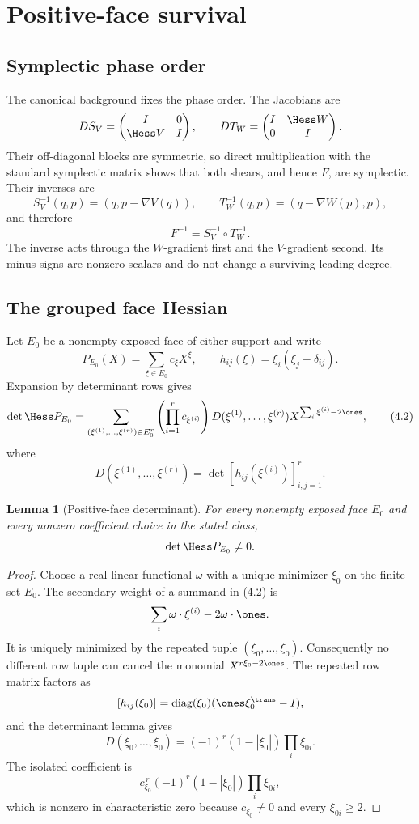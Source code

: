 \documentclass[11pt]{article}
\newtheorem{lemma}[theorem]{Lemma}
\theoremstyle{definition}
\theoremstyle{remark}
\begin{document}
\section{Positive-face survival}

\subsection{Symplectic phase order}

The canonical background fixes the phase order.  The Jacobians are
\[
 DS_V=\begin{pmatrix}I&0\\ \Hess V&I\end{pmatrix},\qquad
 DT_W=\begin{pmatrix}I&\Hess W\\0&I\end{pmatrix}.
\]
Their off-diagonal blocks are symmetric, so direct multiplication with the
standard symplectic matrix shows that both shears, and hence \(F\), are
symplectic.  Their inverses are
\[
 S_V^{-1}(q,p)=(q,p-\nabla V(q)),\qquad
 T_W^{-1}(q,p)=(q-\nabla W(p),p),
\]
and therefore
\[
 F^{-1}=S_V^{-1}\circ T_W^{-1}.
\tag{4.1}
\]
The inverse acts through the \(W\)-gradient first and the \(V\)-gradient
second.  Its minus signs are nonzero scalars and do not change a surviving
leading degree.

\subsection{The grouped face Hessian}

Let \(E_0\) be a nonempty exposed face of either support and write
\[
 P_{E_0}(X)=\sum_{\xi\in E_0}c_\xi X^\xi,\qquad
 h_{ij}(\xi)=\xi_i(\xi_j-\delta_{ij}).
\]
Expansion by determinant rows gives
\[
\det\Hess P_{E_0}
=\sum_{(\xi^{(1)},\ldots,\xi^{(r)})\in E_0^r}
 \left(\prod_{i=1}^r c_{\xi^{(i)}}\right)
 D(\xi^{(1)},\ldots,\xi^{(r)})
 X^{\sum_i\xi^{(i)}-2\ones},
\tag{4.2}
\]
where
\[
 D(\xi^{(1)},\ldots,\xi^{(r)})
 =\det[h_{ij}(\xi^{(i)})]_{i,j=1}^r.
\]

\begin{lemma}[Positive-face determinant]
\label{lem:hessian}
For every nonempty exposed face \(E_0\) and every nonzero coefficient choice
in the stated class,
\[
 \det\Hess P_{E_0}\neq0.
\]
\end{lemma}

\begin{proof}
Choose a real linear functional \(\omega\) with a unique minimizer
\(\xi_0\) on the finite set \(E_0\).  The secondary weight of a summand in
(4.2) is
\[
 \sum_i\omega\cdot\xi^{(i)}-2\omega\cdot\ones.
\]
It is uniquely minimized by the repeated tuple
\((\xi_0,\ldots,\xi_0)\).  Consequently no different row tuple can cancel
the monomial \(X^{r\xi_0-2\ones}\).  The repeated row matrix factors as
\[
 [h_{ij}(\xi_0)]
 =\operatorname{diag}(\xi_0)(\ones\xi_0^{\trans}-I),
\]
and the determinant lemma gives
\[
 D(\xi_0,\ldots,\xi_0)
 =(-1)^r(1-|\xi_0|)\prod_i\xi_{0i}.
\tag{4.3}
\]
The isolated coefficient is
\[
 c_{\xi_0}^{\,r}(-1)^r(1-|\xi_0|)\prod_i\xi_{0i},
\tag{4.4}
\]
which is nonzero in characteristic zero because
\(c_{\xi_0}\neq0\) and every \(\xi_{0i}\geq2\).
\end{proof}
\end{document}
